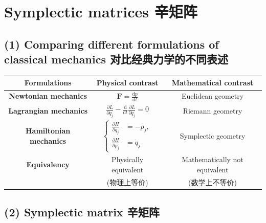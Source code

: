 \section{Symplectic matrices
辛矩阵}\label{symplectic-matrices-ux8f9bux77e9ux9635}

\subsection*{(1) Comparing different formulations of classical
mechanics
对比经典力学的不同表述}\label{comparing-different-formulations-of-classical-mechanics-ux5bf9ux6bd4ux7ecfux5178ux529bux5b66ux7684ux4e0dux540cux8868ux8ff0}

\begin{center}
    \begin{tabular}{|c|c|c|}
        \hline
        \textbf{Formulations} & \textbf{Physical contrast} & \textbf{Mathematical contrast} \\
        \hline
        \rule{0pt}{20pt}
        \textbf{Newtonian mechanics} & $\displaystyle \boldsymbol{F} = \frac{\mathrm{d}p}{\mathrm{d}t}$ & Euclidean geometry \\
        \hline
        \rule{0pt}{20pt}
        \textbf{Lagrangian mechanics} & $\displaystyle \frac{\partial L}{\partial q_j} - \frac{\mathrm{d}}{\mathrm{d}t} \frac{\partial L}{\partial \dot{q}_j} = 0$ & Riemann geometry \\
        \hline
        \rule{0pt}{35pt}
        \textbf{Hamiltonian mechanics} & $\displaystyle \left\{ \begin{aligned} \frac{\partial H}{\partial q_j} &= -\dot{p}_j, \\ \frac{\partial H}{\partial p_j} &= \dot{q}_j \end{aligned} \right.$ & Symplectic geometry \\
        \hline
        \textbf{Equivalency} & Physically equivalent & Mathematically not equivalent \\
        & (物理上等价) & (数学上不等价) \\
        \hline
    \end{tabular}
\end{center}

\subsection*{(2) Symplectic matrix
辛矩阵}\label{symplectic-matrix-ux8f9bux77e9ux9635}

